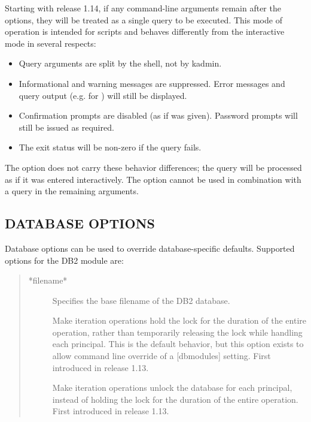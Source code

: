 \documentclass[letterpaper,10pt,english]{sphinxmanual}
\begin{document}
\label{\detokenize{admin/admin_commands/kadmin_local:kadmin-options-end}}
Starting with release 1.14, if any command-line arguments remain after
the options, they will be treated as a single query to be executed.
This mode of operation is intended for scripts and behaves differently
from the interactive mode in several respects:
\begin{itemize}
\item {} 
Query arguments are split by the shell, not by kadmin.

\item {} 
Informational and warning messages are suppressed.  Error messages
and query output (e.g. for ) will still be
displayed.

\item {} 
Confirmation prompts are disabled (as if  was given).
Password prompts will still be issued as required.

\item {} 
The exit status will be non-zero if the query fails.

\end{itemize}

The  option does not carry these behavior differences; the query
will be processed as if it was entered interactively.  The 
option cannot be used in combination with a query in the remaining
arguments.


\subsection{DATABASE OPTIONS}
\label{\detokenize{admin/admin_commands/kadmin_local:database-options}}\label{\detokenize{admin/admin_commands/kadmin_local:dboptions}}
Database options can be used to override database-specific defaults.
Supported options for the DB2 module are:
\begin{quote}
\begin{description}
\item[{*filename*}] \leavevmode
Specifies the base filename of the DB2 database.

\item[{}] \leavevmode
Make iteration operations hold the lock for the duration of
the entire operation, rather than temporarily releasing the
lock while handling each principal.  This is the default
behavior, but this option exists to allow command line
override of a {[}dbmodules{]} setting.  First introduced in
release 1.13.

\item[{}] \leavevmode
Make iteration operations unlock the database for each
principal, instead of holding the lock for the duration of the
entire operation.  First introduced in release 1.13.

\end{description}
\end{quote}
\end{document}
